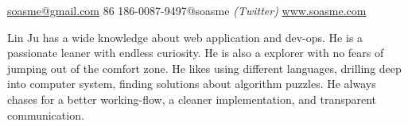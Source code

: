 \documentclass[10pt,a4paper]{article} %
\begin{document}


\noindent\href{mailto:soasme@gmail.com}{soasme@gmail.com}\bull
\textsmaller{+}86 186-0087-9497\bull @soasme \textit{(Twitter)}\bull
\href{http://www.soasme.com}{www.soasme.com}\\ %
\spacedhrule{0.9em}{-0.4em} %



\vspace{-1.3em} %

\begin{multicols}{2}  %
  Lin Ju has a wide knowledge about web application and dev-ops. He is a passionate leaner with endless curiosity. He is also a explorer with no fears of jumping out of the comfort zone. He likes using different languages, drilling deep into computer system, finding solutions about algorithm puzzles. He always chases for a better working-flow, a cleaner implementation, and transparent communication.
\end{multicols}

\spacedhrule{0.5em}{-0.4em} %


\end{document}
